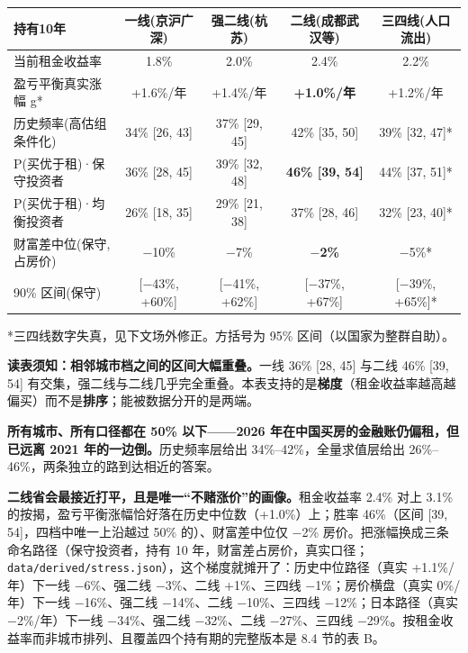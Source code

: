 \documentclass[11pt,a4paper]{ctexart}
\begin{document}
\begin{table}[H]\centering\footnotesize
\begin{tabular}{lcccc}
\toprule
持有10年 & 一线(京沪广深) & 强二线(杭苏) & 二线(成都武汉等) & 三四线(人口流出) \\
\midrule
当前租金收益率 & 1.8\% & 2.0\% & 2.4\% & 2.2\% \\
盈亏平衡真实涨幅 g* & +1.6\%/年 & +1.4\%/年 & \textbf{+1.0\%/年} & +1.2\%/年 \\
历史频率(高估组条件化) & 34\% [26, 43] & 37\% [29, 45] & 42\% [35, 50] & 39\% [32, 47]* \\
P(买优于租)·保守投资者 & 36\% [28, 45] & 39\% [32, 48] & \textbf{46\% [39, 54]} & 44\% [37, 51]* \\
P(买优于租)·均衡投资者 & 26\% [18, 35] & 29\% [21, 38] & 37\% [28, 46] & 32\% [23, 40]* \\
财富差中位(保守, 占房价) & $-$10\% & $-$7\% & \textbf{$-$2\%} & $-$5\%* \\
90\% 区间(保守) & [$-$43\%, +60\%] & [$-$41\%, +62\%] & [$-$37\%, +67\%] & [$-$39\%, +65\%]* \\
\bottomrule
\end{tabular}
\end{table}

*三四线数字失真，见下文场外修正。方括号为 95\% 区间（以国家为整群自助）。

\textbf{读表须知：相邻城市档之间的区间大幅重叠。}一线 36\% [28, 45] 与二线 46\% [39, 54] 有交集，强二线与二线几乎完全重叠。本表支持的是\textbf{梯度}（租金收益率越高越偏买）而不是\textbf{排序}；能被数据分开的是两端。

\textbf{所有城市、所有口径都在 50\% 以下——2026 年在中国买房的金融账仍偏租，但已远离 2021 年的一边倒。}历史频率层给出 34\%--42\%，全量求值层给出 26\%--46\%，两条独立的路到达相近的答案。

\textbf{二线省会最接近打平，且是唯一``不赌涨价''的画像。}租金收益率 2.4\% 对上 3.1\% 的按揭，盈亏平衡涨幅恰好落在历史中位数（+1.0\%）上；胜率 46\%（区间 [39, 54]，四档中唯一上沿越过 50\% 的）、财富差中位仅 $-$2\% 房价。把涨幅换成三条命名路径（保守投资者，持有 10 年，财富差占房价，真实口径；\texttt{data/derived/stress.json}），这个梯度就摊开了：历史中位路径（真实 +1.1\%/年）下一线 $-$6\%、强二线 $-$3\%、二线 +1\%、三四线 $-$1\%；房价横盘（真实 0\%/年）下一线 $-$16\%、强二线 $-$14\%、二线 $-$10\%、三四线 $-$12\%；日本路径（真实 $-$2\%/年）下一线 $-$34\%、强二线 $-$32\%、二线 $-$27\%、三四线 $-$29\%。按租金收益率而非城市排列、且覆盖四个持有期的完整版本是 8.4 节的表 B。
\end{document}
